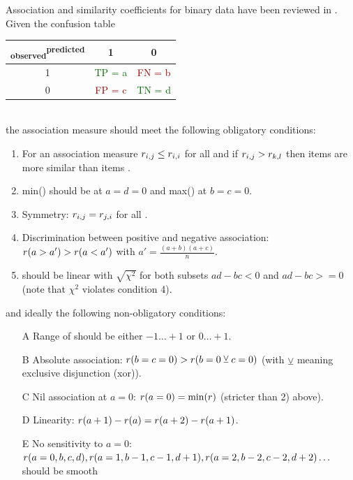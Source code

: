 \begin{refsection}
Association and similarity coefficients for binary data have been reviewed in \parencite{Hub-82}.
Given the confusion table \label{tab:binary}
\begin{tabular}{c|cc}
\toprule
\textsubscript{observed}\textsuperscript{predicted}  & 1 & 0 \\
\midrule
1 & \textcolor{DarkGreen}{TP = a} & \textcolor{DarkRed}{FN = b}   \\
0 & \textcolor{DarkRed}{FP = c}   & \textcolor{DarkGreen}{TN = d} \\
\bottomrule
\end{tabular}\\
the association measure  should meet the following obligatory conditions:
\begin{enumerate}
  \item{For an association measure \(r_{i,j} \leq r_{i,i} \) for all  and if \(r_{i,j} > r_{k,l} \) then items  are more similar than items .  }
  \item{min() should be at \(a = d = 0 \) and max() at \(b = c = 0 \).}
  \item{Symmetry: \(r_{i,j} = r_{j,i} \) for all .}
  \item{Discrimination between positive and negative association: \(r(a > a') > r(a<a') \) with \(a' = \frac{(a+b) (a+c)}{n} \).}
  \item{ should be linear with \(\sqrt{\chi^2} \) for both subsets \(ad-bc < 0 \) and \(ad-bc >= 0 \) (note that \(\chi^2 \) violates condition 4).}
\end{enumerate}
and ideally the following non-obligatory conditions:
\begin{enumerate}
  \item[A]{Range of  should be either \(-1\ldots +1 \) or \(0\ldots +1 \). }
  \item[B]{Absolute association: \(r(b=c=0) > r(b = 0 \veebar c = 0) \) (with \(\veebar \) meaning exclusive disjunction (xor)). }
  \item[C]{Nil association at \(a = 0 \): \(r(a=0) = \mathrm{min}(r) \) (stricter than 2) above).}
  \item[D]{Linearity: \(r(a+1) - r(a) = r(a+2) - r(a+1) \). }
  \item[E]{No sensitivity to \(a = 0 \): \(r(a=0,b,c,d), r(a=1,b-1,c-1,d+1), r(a=2,b-2,c-2,d+2)\ldots \) should be smooth}

\end{enumerate}
\end{refsection}
